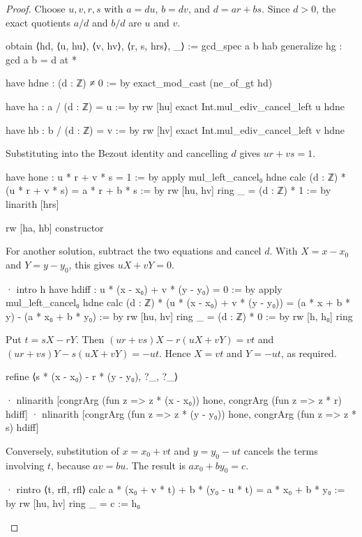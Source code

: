 \begin{proof}
  Choose $u,v,r,s$ with $a=du$, $b=dv$, and $d=ar+bs$.
  Since $d>0$, the exact quotients $a/d$ and $b/d$ are $u$ and $v$.

  \begin{lean}
    obtain ⟨hd, ⟨u, hu⟩, ⟨v, hv⟩, ⟨r, s, hrs⟩, _⟩ := gcd_spec a b hab
    generalize hg : gcd a b = d at *

    have hdne : (d : ℤ) ≠ 0 := by
      exact_mod_cast (ne_of_gt hd)

    have ha : a / (d : ℤ) = u := by
      rw [hu]
      exact Int.mul_ediv_cancel_left u hdne

    have hb : b / (d : ℤ) = v := by
      rw [hv]
      exact Int.mul_ediv_cancel_left v hdne
  \end{lean}

  Substituting into the Bezout identity and cancelling $d$ gives $ur+vs=1$.

  \begin{lean}
    have hone : u * r + v * s = 1 := by
      apply mul_left_cancel₀ hdne
      calc
        (d : ℤ) * (u * r + v * s) = a * r + b * s := by
          rw [hu, hv]
          ring
        _ = (d : ℤ) * 1 := by linarith [hrs]

    rw [ha, hb]
    constructor
  \end{lean}

  For another solution, subtract the two equations and cancel $d$.
  With $X=x-x_0$ and $Y=y-y_0$, this gives $uX+vY=0$.

  \begin{lean}
    · intro h
      have hdiff : u * (x - x₀) + v * (y - y₀) = 0 := by
        apply mul_left_cancel₀ hdne
        calc
          (d : ℤ) * (u * (x - x₀) + v * (y - y₀)) =
              (a * x + b * y) - (a * x₀ + b * y₀) := by
                rw [hu, hv]
                ring
          _ = (d : ℤ) * 0 := by
            rw [h, h₀]
            ring
  \end{lean}

  Put $t=sX-rY$.
  Then $(ur+vs)X-r(uX+vY)=vt$ and $(ur+vs)Y-s(uX+vY)=-ut$.
  Hence $X=vt$ and $Y=-ut$, as required.

  \begin{lean}
    refine ⟨s * (x - x₀) - r * (y - y₀), ?_, ?_⟩

    · nlinarith [congrArg (fun z => z * (x - x₀)) hone,
        congrArg (fun z => z * r) hdiff]
    · nlinarith [congrArg (fun z => z * (y - y₀)) hone,
        congrArg (fun z => z * s) hdiff]
  \end{lean}

  Conversely, substitution of $x=x_0+vt$ and $y=y_0-ut$ cancels the terms involving $t$, because
  $av=bu$.
  The result is $ax_0+by_0=c$.

  \begin{lean}
    · rintro ⟨t, rfl, rfl⟩
      calc
        a * (x₀ + v * t) + b * (y₀ - u * t) = a * x₀ + b * y₀ := by
          rw [hu, hv]
          ring
        _ = c := h₀
  \end{lean}

\end{proof}

